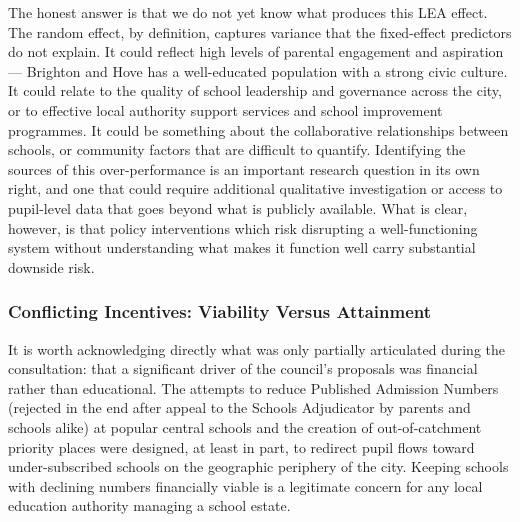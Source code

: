 \documentclass[
  11pt,
]{article}
\begin{document}
The honest answer is that we do not yet know what produces this LEA
effect. The random effect, by definition, captures variance that the
fixed-effect predictors do not explain. It could reflect high levels of
parental engagement and aspiration --- Brighton and Hove has a
well-educated population with a strong civic culture. It could relate to
the quality of school leadership and governance across the city, or to
effective local authority support services and school improvement
programmes. It could be something about the collaborative relationships
between schools, or community factors that are difficult to quantify.
Identifying the sources of this over-performance is an important
research question in its own right, and one that could require
additional qualitative investigation or access to pupil-level data that
goes beyond what is publicly available. What is clear, however, is that
policy interventions which risk disrupting a well-functioning system
without understanding what makes it function well carry substantial
downside risk.

\subsubsection{Conflicting Incentives: Viability Versus
Attainment}\label{conflicting-incentives-viability-versus-attainment}

It is worth acknowledging directly what was only partially articulated
during the consultation: that a significant driver of the council's
proposals was financial rather than educational. The attempts to reduce
Published Admission Numbers (rejected in the end after appeal to the
Schools Adjudicator by parents and schools alike) at popular central
schools and the creation of out-of-catchment priority places were
designed, at least in part, to redirect pupil flows toward
under-subscribed schools on the geographic periphery of the city.
Keeping schools with declining numbers financially viable is a
legitimate concern for any local education authority managing a school
estate.
\end{document}
